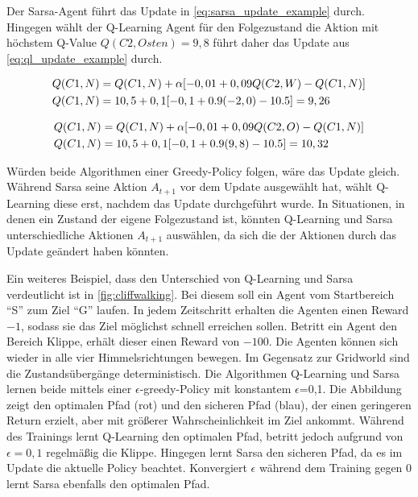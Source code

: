 Der Sarsa-Agent führt das Update in \cref{eq:sarsa_update_example} durch. Hingegen wählt der Q-Learning Agent für den Folgezustand die Aktion mit höchstem Q-Value $Q(C2,Osten)=9,8$ führt daher das Update aus \cref{eq:ql_update_example} durch.

\begin{equation}
    \label{eq:sarsa_update_example}
    \equationentry{Beispiel TD Update Sarsa}
    \begin{split}
    Q(C1,N) & =Q(C1,N)+\alpha[-0,01+0,09Q(C2, W)-Q(C1,N)] \\
    Q(C1,N) & =10,5+0,1[-0,1+0.9(-2,0)-10.5]=9,26
    \end{split}
\end{equation}

\begin{equation}
    \label{eq:ql_update_example}
    \equationentry{Beispiel TD Update Q-Learning}
    \begin{split}
        Q(C1,N) &=Q(C1,N)+\alpha[-0,01+0,09Q(C2, O)-Q(C1,N)]\\
        Q(C1,N) &=10,5+0,1[-0,1+0.9(9,8)-10.5]=10,32
    \end{split}
\end{equation}



Würden beide Algorithmen einer Greedy-Policy folgen, wäre das Update gleich. 
Während Sarsa seine Aktion $A_{t+1}$ vor dem Update ausgewählt hat, wählt Q-Learning diese erst, nachdem das Update durchgeführt wurde. 
In Situationen, in denen ein Zustand der eigene Folgezustand ist, könnten Q-Learning und Sarsa unterschiedliche Aktionen $A_{t+1}$ auswählen, da sich die \qValues der Aktionen durch das Update geändert haben könnten. \cite{IrelandComparisonThereFundamental}

Ein weiteres Beispiel, dass den Unterschied von Q-Learning und Sarsa verdeutlicht ist  in \cref{fig:cliffwalking}. 
Bei diesem soll ein Agent vom Startbereich “S” zum Ziel “G” laufen. 
In jedem Zeitschritt erhalten die Agenten einen Reward $-1$, sodass sie das Ziel möglichst schnell erreichen sollen. 
Betritt ein Agent den Bereich Klippe, erhält dieser einen Reward von $-100$. 
Die Agenten können sich wieder in alle vier Himmelsrichtungen bewegen. 
Im Gegensatz zur Gridworld sind die Zustandsübergänge deterministisch. 
Die Algorithmen Q-Learning und Sarsa lernen beide mittels einer $\epsilon$-greedy-Policy mit konstantem $\epsilon$=0,1. 
Die Abbildung zeigt den optimalen Pfad (rot) und den sicheren Pfad (blau), der einen geringeren Return erzielt, aber mit größerer Wahrscheinlichkeit im Ziel ankommt. 
Während des Trainings lernt Q-Learning den optimalen Pfad, betritt jedoch aufgrund von $\epsilon=0,1$ regelmäßig die Klippe. 
Hingegen lernt Sarsa den sicheren Pfad, da es im Update die aktuelle Policy beachtet. 
Konvergiert $\epsilon$ während dem Training gegen 0 lernt Sarsa ebenfalls den optimalen Pfad. \cite[S. 132]{suttonReinforcementLearningIntroduction2018}


